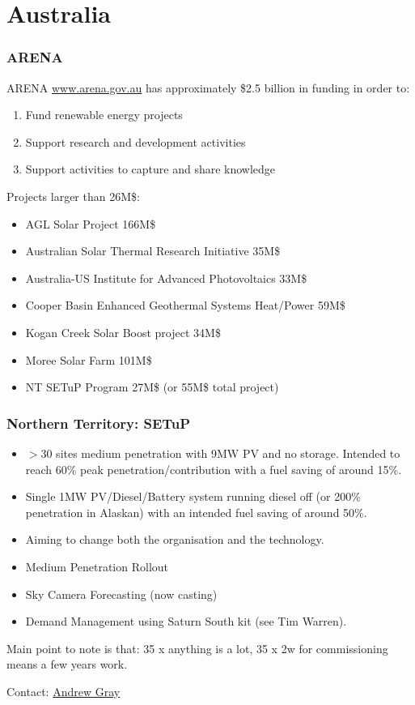 \documentclass{beamer}
\begin{document}
\section{Australia}
\begin{frame}\frametitle{ARENA}
  ARENA \href{www.arena.gov.au}{www.arena.gov.au} has approximately
  \$2.5 billion in funding in order to:
  \begin{enumerate}
  \item Fund renewable energy projects
  \item Support research and development activities
  \item Support activities to capture and share knowledge
  \end{enumerate}
\pause
Projects larger than 26M\$:
\begin{itemize}
\item AGL Solar Project 166M\$
\item Australian Solar Thermal Research Initiative 35M\$
\item Australia-US Institute for Advanced Photovoltaics 33M\$
\item Cooper Basin Enhanced Geothermal Systems Heat/Power 59M\$
\item Kogan Creek Solar Boost project 34M\$
\item Moree Solar Farm 101M\$
\item NT SETuP Program 27M\$ (or 55M\$ total project)
\end{itemize}
\end{frame}

\begin{frame}\frametitle{Northern Territory: SETuP} 
  \begin{itemize}
  \item $>$30 sites medium penetration with 9MW PV and no storage.
    \pause
    Intended to reach 60\% peak penetration/contribution with a fuel
    saving of around 15\%.
  \item Single 1MW PV/Diesel/Battery system running diesel off (or 200\%
    penetration in Alaskan) with an intended fuel saving of around 50\%.
  \item Aiming to change both the organisation and the technology.
  \end{itemize}
  \pause
  \begin{itemize}
  \item Medium Penetration Rollout
  \item Sky Camera Forecasting (now casting)
  \item Demand Management using Saturn South kit (see Tim Warren).
  \end{itemize}
  \pause
  Main point to note is that: 35 x anything is a lot, 35 x 2w for
  commissioning means a few years work.

  Contact: \href{mailto:andrew.gray@powerwater.com.au}{Andrew Gray}
\end{frame}

\end{document}
